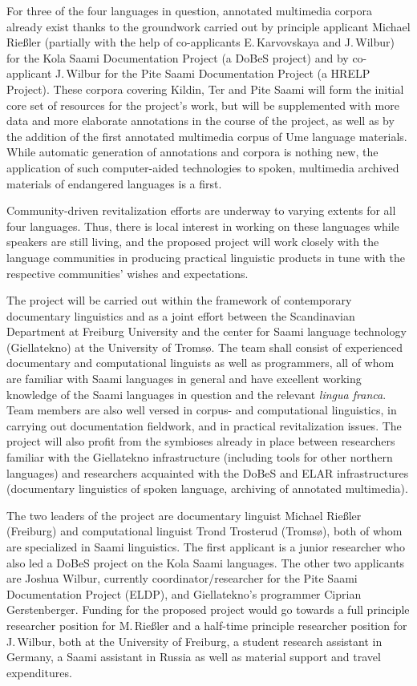 \documentclass[a4paper,12pt]{article}
\begin{document}
For three of the four languages in question, annotated multimedia corpora already exist thanks to the groundwork carried out by principle applicant Michael Rießler (partially with the help of co-applicants E.\,Karvovskaya and J.\,Wilbur) for the Kola Saami Documentation Project (a DoBeS project) and by co-applicant J.\,Wilbur for the Pite Saami Documentation Project (a HRELP Project). These corpora covering Kildin, Ter and Pite Saami will form the initial core set of resources for the project's work, but will be supplemented with more data and more elaborate annotations in the course of the project, as well as by the addition of the first annotated multimedia corpus of Ume language materials. While automatic generation of annotations and corpora is nothing new, the application of such computer-aided technologies to spoken, multimedia archived materials of endangered languages is a first.

Community-driven revitalization efforts are underway to varying extents for all four languages. Thus, there is local interest in working on these languages while speakers are still living, and the proposed project will work closely with the language communities in producing practical linguistic products in tune with the respective communities' wishes and expectations.

The project will be carried out within the framework of contemporary documentary linguistics and as a joint effort between the Scandinavian Department at Freiburg University and the center for Saami language technology (Giellatekno) at the University of Tromsø.
The team shall consist of experienced documentary and computational linguists as well as programmers, all of whom are familiar with Saami languages in general and have excellent working knowledge of the Saami languages in question and the relevant \textit{lingua franca}. Team members are also well versed in corpus- and computational linguistics, in carrying out documentation fieldwork, and in practical revitalization issues. The project will also profit from the symbioses already in place between researchers familiar with the Giellatekno infrastructure (including tools for other northern languages) and researchers acquainted with the DoBeS and ELAR infrastructures (documentary linguistics of spoken language, archiving of annotated multimedia).

The two leaders of the project are documentary linguist Michael Rießler (Freiburg) and computational linguist Trond Trosterud (Tromsø), both of whom are specialized in Saami linguistics. The first applicant is a junior researcher who also led a DoBeS project on the Kola Saami languages. The other two applicants are Joshua Wilbur, currently coordinator/researcher for the Pite Saami Documentation Project (ELDP), and Giellatekno's programmer Ciprian Gerstenberger. Funding for the proposed project would go towards a full principle researcher position for M.\,Rießler and a half-time principle researcher position for J.\,Wilbur, both at the University of Freiburg, a student research assistant in Germany, a Saami assistant in Russia as well as material support and travel expenditures.
\end{document}
